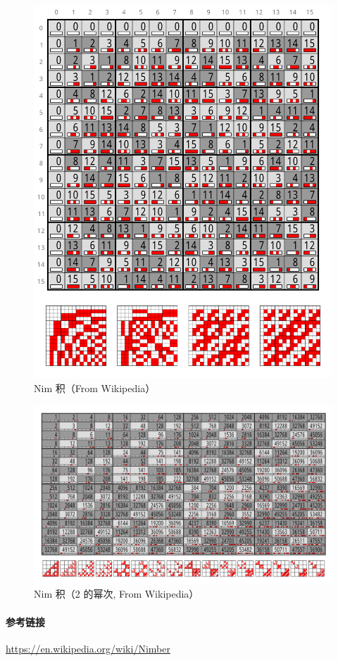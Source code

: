\begin{figure}
    \label{img:nim-prod}
    \includegraphics{img/Nimber-multiplication.svg}
    \caption{Nim 积（From Wikipedia）}
\end{figure}

\begin{figure}
    \label{img:nim-prod-pow2}
    \includegraphics{img/Nimber-multiplication-of-powers-of-two.svg}
    \caption{Nim 积（2 的幂次, From Wikipedia）}
\end{figure}

\paragraph{参考链接}

\url{https://en.wikipedia.org/wiki/Nimber}
